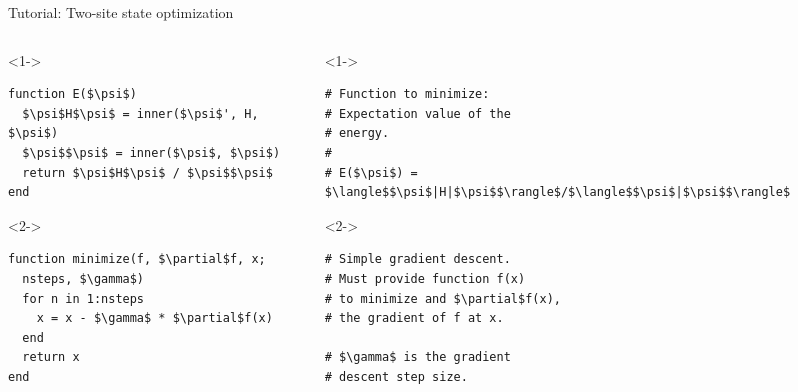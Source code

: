 \begin{frame}[fragile]{Tutorial: Two-site state optimization}


\begin{columns}

\begin{column}{5cm}

\begin{onlyenv}<1->

\begin{lstlisting}[language=JuliaLocal, style=julia, mathescape, basicstyle=\small]
function E($\psi$)
  $\psi$H$\psi$ = inner($\psi$', H, $\psi$)
  $\psi$$\psi$ = inner($\psi$, $\psi$)
  return $\psi$H$\psi$ / $\psi$$\psi$
end
\end{lstlisting}

\end{onlyenv}

\begin{onlyenv}<2->

\begin{lstlisting}[language=JuliaLocal, style=julia, mathescape, basicstyle=\small]
function minimize(f, $\partial$f, x;
  nsteps, $\gamma$)
  for n in 1:nsteps
    x = x - $\gamma$ * $\partial$f(x)
  end
  return x
end
\end{lstlisting}

\end{onlyenv}

\end{column}

\begin{column}{5cm}

\begin{onlyenv}<1->

\begin{lstlisting}[style=julia, numbers=none, mathescape, basicstyle=\small]
# Function to minimize:
# Expectation value of the
# energy.
#
# E($\psi$) = $\langle$$\psi$|H|$\psi$$\rangle$/$\langle$$\psi$|$\psi$$\rangle$
\end{lstlisting}

\end{onlyenv}

\begin{onlyenv}<2->

\begin{lstlisting}[style=julia, numbers=none, mathescape, basicstyle=\small]
# Simple gradient descent.
# Must provide function f(x)
# to minimize and $\partial$f(x),
# the gradient of f at x.

# $\gamma$ is the gradient
# descent step size.
\end{lstlisting}

\end{onlyenv}

\end{column}

\end{columns}

\end{frame}
